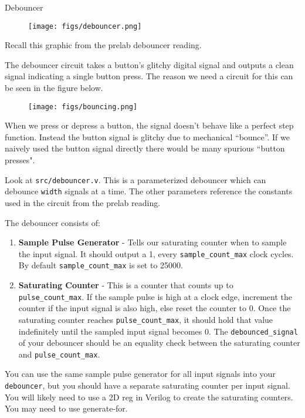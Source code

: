 \documentclass[11pt]{article}
\makeatletter
\renewcommand{\subsection}
{\@startsection {subsection}{1}{0pt}
 {-1ex}
 {0.5ex}
 {\bfseries\normalsize}}
\makeatother
\begin{document}
\subsection{Debouncer}
\begin{figure}[H]
  \centerline{\texttt{[image: figs/debouncer.png]}}
\end{figure}

Recall this graphic from the prelab debouncer reading.

The debouncer circuit takes a button's glitchy digital signal and outputs a clean signal indicating a single button press.
The reason we need a circuit for this can be seen in the figure below.

\begin{figure}[H]
  \centerline{\texttt{[image: figs/bouncing.png]}}
\end{figure}

When we press or depress a button, the signal doesn't behave like a perfect step function.
Instead the button signal is glitchy due to mechanical ``bounce''.
If we naively used the button signal directly there would be many spurious ``button presses".

Look at \verb|src/debouncer.v|.
This is a parameterized debouncer which can debounce \verb|width| signals at a time.
The other parameters reference the constants used in the circuit from the prelab reading.

The debouncer consists of:
\begin{enumerate}
  \item \textbf{Sample Pulse Generator} - Tells our saturating counter when to sample the input signal. It should output a 1, every \verb|sample_count_max| clock cycles. By default \verb|sample_count_max| is set to 25000.
  \item \textbf{Saturating Counter} - This is a counter that counts up to \verb|pulse_count_max|.
    If the sample pulse is high at a clock edge, increment the counter if the input signal is also high, else reset the counter to 0.
    Once the saturating counter reaches \verb|pulse_count_max|, it should hold that value indefinitely until the sampled input signal becomes 0.
    The \verb|debounced_signal| of your debouncer should be an equality check between the saturating counter and \verb|pulse_count_max|.
\end{enumerate}

You can use the same sample pulse generator for all input signals into your \verb|debouncer|, but you should have a separate saturating counter per input signal.
You will likely need to use a 2D reg in Verilog to create the saturating counters. You may need to use generate-for.
\end{document}
